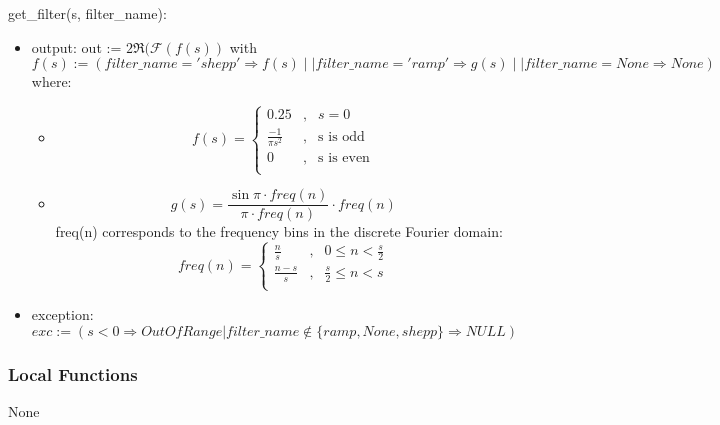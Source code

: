 \documentclass[12pt, titlepage]{article}
\begin{document}
\noindent get\_filter(s, filter\_name):
\begin{itemize}
\item output: out := \(2\Re(\mathcal{F}(f(s))\) with\\
  \(f(s) := (filter\_name = 'shepp' \Rightarrow f(s) \mid\mid filter\_name = 'ramp' \Rightarrow g(s) \mid\mid filter\_name = None \Rightarrow None)\) where: \\
  \begin{itemize}
    \item
      \begin{equation}
        f(s) =
        \left\{
          \begin{aligned}
            0.25 &, & s = 0 \\
            \frac{-1}{{\pi s}^2} &, & \text{s is odd}\\
            0 &, & \text{s is even}\\
          \end{aligned}
        \right.
      \end{equation}

    \item
      \begin{equation}
        g(s) =
        \frac{\sin{\pi\cdot freq(n)}}{\pi\cdot freq(n)} \cdot freq(n)
      \end{equation}
      freq(n) corresponds to the frequency bins in the discrete Fourier domain:\\
      \begin{equation}
        freq(n) =
        \left\{
          \begin{aligned}
            \frac{n}{s} &, & 0 \leq n < \frac{s}{2} \\
            \frac{n - s}{s} &, & \frac{s}{2} \leq n < s \\
          \end{aligned}
        \right.
      \end{equation}
    \end{itemize}

\item exception: \(exc := (s < 0 \Rightarrow OutOfRange | filter\_name \notin \{ramp, None, shepp\}
  \Rightarrow NULL)\)
\end{itemize}


\subsubsection{Local Functions}
None
\end{document}
